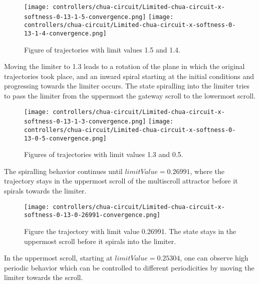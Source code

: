 \documentclass[main]{subfiles}
\begin{document}
\begin{figure}[H]
\centering
\texttt{[image: controllers/chua-circuit/Limited-chua-circuit-x-softness-0-13-1-5-convergence.png]}
\texttt{[image: controllers/chua-circuit/Limited-chua-circuit-x-softness-0-13-1-4-convergence.png]}
\caption[Figure of fix point convergence]{Figure of trajectories with limit values 1.5 and 1.4.}
\label{figure:x-0.13-convergence-trajectories}
\end{figure}

Moving the limiter to 1.3 leads to a rotation of the plane in which the original trajectories took place, and an inward spiral starting at the initial conditions and progressing towards the limiter occurs. %
%
The state spiralling into the limiter tries to pass the limiter from the uppermost the gateway scroll to the lowermost scroll.

\begin{figure}[H]
\centering
\texttt{[image: controllers/chua-circuit/Limited-chua-circuit-x-softness-0-13-1-3-convergence.png]}
\texttt{[image: controllers/chua-circuit/Limited-chua-circuit-x-softness-0-13-0-5-convergence.png]}
\caption[Figure of period 1 limit cycle]{Figures of trajectories with limit values 1.3 and 0.5.}
\label{figure:x-0.13-spiral-trajectories}
\end{figure}

The spiralling behavior continues until \(limitValue=0.26991\), where the trajectory stays in the uppermost scroll of the multiscroll attractor before it spirals towards the limiter.

\begin{figure}[H]
\centering
\texttt{[image: controllers/chua-circuit/Limited-chua-circuit-x-softness-0-13-0-26991-convergence.png]}
\caption[Figure of trajectory with limit value 0.26991.]{Figure the trajectory with limit value 0.26991. The state stays in the uppermost scroll before it spirals into the limiter.}
\label{figure:x-0.13-upper-scroll-trajectory}
\end{figure}

In the uppermost scroll, starting at \(limitValue=0.25304\), one can observe high periodic behavior which can be controlled to different periodicities by moving the limiter towards the scroll. 
\end{document}
